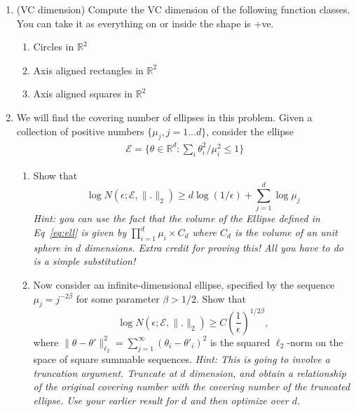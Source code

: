 \documentclass[11pt]{article}
\newcommand{\R}{\mathbb{R}}
\begin{document}
\begin{enumerate}
\begin{enumerate}
\begin{enumerate}
	\end{enumerate}
\end{enumerate}
 \item (VC dimension) Compute the VC dimension of the following function classes. You can take it as everything on or inside the shape is +ve.
\begin{enumerate}
	\item Circles in $\R^2$ 
	\item Axis aligned rectangles in $\R^2$
	\item Axis aligned squares in $\R^2$
\end{enumerate}
\item We will find the covering number of ellipses in this problem.  Given a collection of positive numbers $\{\mu_j,j=1\dots d\}$, consider the ellipse \begin{align}\label{eq:ell}
\mathcal{E}=\{\theta\in\R^d : \sum_i \theta_i^2/\mu_i^2\leq 1\}
\end{align}
\begin{enumerate}
	\item Show that $$\log N(\epsilon; \mathcal{E},\|.\|_2)\geq d\log (1/\epsilon)+\sum_{j=1}^d\log \mu_j$$
	\textit{Hint: you can use the fact that the volume of the Ellipse defined in Eq~\ref{eq:ell} is given by $\prod_{i=1}^d \mu_i \times C_d$ where $C_d$ is the volume of an unit sphere in $d$ dimensions. Extra credit for proving this! All you have to do is a simple substitution!}
	\item Now consider an infinite-dimensional ellipse, specified by the sequence $\mu_j = j^{-2\beta}$
	for some parameter $\beta > 1/2$. Show that
	$$\log N(\epsilon; \mathcal{E},\|.\|_2)\geq C \left(\frac{1}{\epsilon}\right)^{1/2\beta},$$
	where $\|\theta-\theta'\|_{\ell_2}^2=\sum_{j=1}^\infty (\theta_i-\theta'_i)^2$ is the squared $\ell_2$-norm on the space of square summable sequences.
	\textit{Hint: This is going to involve a truncation argument. Truncate at $d$ dimension, and obtain a relationship of the original covering number with the covering number of the truncated ellipse. Use your earlier result for $d$ and then optimize over $d$. }
\end{enumerate}
\end{enumerate}
\end{document}
